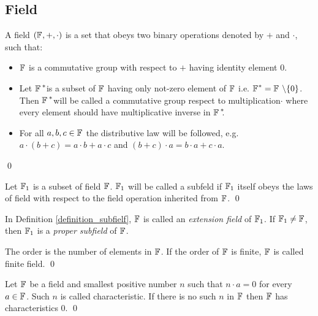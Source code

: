 \subsection{Field}
\begin{definition}[Field]
	A field $({\mathbb{F}}_{},+,\cdot)$ is a set that obeys two binary operations denoted by $+$ and $\cdot$, such that:
	\begin{itemize}
			\item ${\mathbb{F}}_{}$ is a commutative group with respect to $+$ having identity element $0$.
			
			\item Let ${{\mathbb{F}}_{\,}}^{\ast}\!\!$ is a subset of ${\mathbb{F}}_{}$ having only not-zero element of ${\mathbb{F}}_{}$ i.e. ${{\mathbb{F}}_{}}^{\ast}  = {{\mathbb{F}}_{} ~\backslash \{0\}}$. 
			Then ${{\mathbb{F}}_{\,}}^{\ast}\!\!$ will be called a commutative group respect to multiplication$\cdot$  where every element should have multiplicative inverse in  ${{\mathbb{F}}_{\,}}^{\ast}\!\!$.
			\item For all $a,b,c \in{\mathbb{F}}_{}$  the distributive law will be followed, e.g. $a\cdot(b+c)=a\cdot b+a\cdot c$ and $(b+c)\cdot a=b\cdot a +c\cdot a$.
	\end{itemize}
	\qed
\end{definition}
\begin{definition}\hspace{0em} \label{definition_subfielf}
	Let ${\mathbb{F}}_{1}$ is a subset of field ${\mathbb{F}}_{}$. ${\mathbb{F}}_{1}$ will be called a subfeld if ${\mathbb{F}}_{1}$ itself obeys the laws of field with respect to the field operation inherited from  ${\mathbb{F}}_{}$.
	\qed
\end{definition}
\begin{remark}
	 In Definition \ref{definition_subfielf}, ${\mathbb{F}}_{}$ is called an {\em extension field} of ${\mathbb{F}}_{1}$.
	  If ${\mathbb{F}}_{1}\neq {\mathbb{F}}_{}$, then ${\mathbb{F}}_{1}$ is a {\em proper subfield} of ${\mathbb{F}}_{}$.
 \end{remark}

\begin{definition}\hspace{0em}
	The order is the number of elements in ${\mathbb{F}}_{}$. If the order of ${\mathbb{F}}_{}$ is finite, ${\mathbb{F}}_{}$ is called finite field. 
	\qed
\end{definition}
\begin{definition}\hspace{0em}
	Let ${\mathbb{F}}_{}$ be a field and smallest positive number $n$ such that $n \cdot a= 0$ for every $a\in {\mathbb{F}}_{}$. Such $n$ is called characteristic. If there is no such $n$ in  ${\mathbb{F}}_{}$ then ${\mathbb{F}}_{}$ has characteristics $0$.
	\qed
\end{definition}


